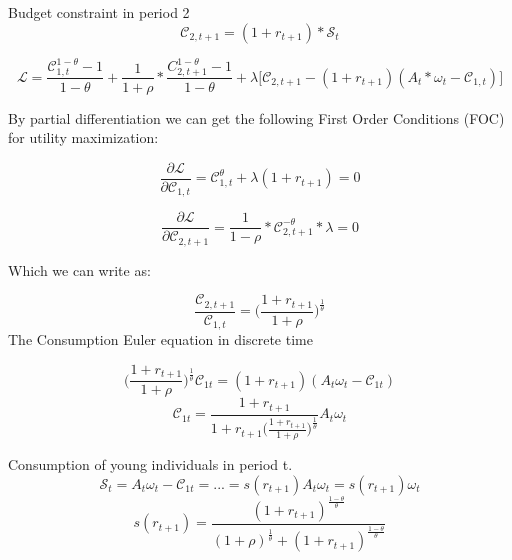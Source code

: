 Budget constraint in period 2
\begin{equation*}
    \mathcal{C}_{2, t+1}=(1+r_{t+1})*\mathcal{S}_t
\end{equation*}

\begin{equation}
    \mathcal{L}=\frac{\mathcal{C}_{1, t}^{1-\theta}-1}{1-\theta}+\frac{1}{1+\rho}*\frac{C_{2, t+1}^{1-\theta}-1}{1-\theta}+\lambda \Bigg[\mathcal{C}_{2, t+1}-(1+r_{t+1})(A_t*\omega_t - \mathcal{C}_{1, t})\Bigg]
\end{equation}

By partial differentiation we can get the following First Order Conditions (FOC) for utility maximization:

\begin{equation*}
    \frac{\partial \mathcal{L}}{\partial \mathcal{C}_{1, t}} = \mathcal{C}_{1, t}^{\theta} + \lambda (1+r_{t+1}) = 0
\end{equation*}

\begin{equation*}
    \frac{\partial \mathcal{L}}{\partial \mathcal{C}_{2, t+1}} = \frac{1}{1-\rho} * \mathcal{C}_{2, t+1}^{-\theta}*\lambda = 0
\end{equation*}

Which we can write as:

\begin{tcolorbox}[fontupper=\large, fontlower=\normalsize]
\begin{equation}\label{consumption_euler_equation}
\frac{\mathcal{C}_{2, t+1}}{\mathcal{C}_{1, t}}= \Bigg( \frac{1+r_{t+1}}{1+\rho} \Bigg)^{\frac{1}{\theta}}
\end{equation}
\tcblower
The Consumption Euler equation in discrete time
\end{tcolorbox}

\begin{equation*}
    \bigg(\frac{1+r_{t+1}}{1+\rho}\bigg)^{\frac{1}{\theta}}\mathcal{C}_{1t}=(1+r_{t+1})(A_{t}\omega_{t}-\mathcal{C}_{1t})
\end{equation*}
\begin{equation*}
    \mathcal{C}_{1t}=\frac{1+r_{t+1}}{1+r_{t+1}\big(\frac{1+r_{t+1}}{1+\rho}\big)^{\frac{1}{\theta}}}A_{t}\omega_{t}
\end{equation*}

Consumption of young individuals in period t. 
\begin{equation*}
    \mathcal{S}_{t}= A_{t}\omega_{t}-\mathcal{C}_{1t}=...=s(r_{t+1})A_{t}\omega_{t}=s(r_{t+1})\omega_{t}
\end{equation*}
\begin{equation*}
    s(r_{t+1})=\frac{(1+r_{t+1})^\frac{1-\theta}{\theta}}{(1+\rho)^\frac{1}{\theta}+(1+r_{t+1})^\frac{1-\theta}{\theta}}
\end{equation*}

